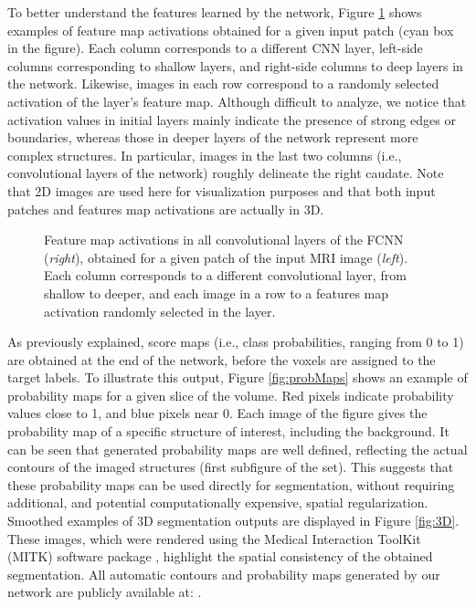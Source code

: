 \documentclass[twoside,fleqn,espcrc2]{elsarticle}
\begin{document}
To better understand the features learned by the network, Figure \ref{fig:featMaps} shows examples of feature map activations obtained for a given input patch (cyan box in the figure). Each column corresponds to a different CNN layer, left-side columns corresponding to shallow layers, and right-side columns to deep layers in the network. Likewise, images in each row correspond to a randomly selected activation of the layer's feature map. Although difficult to analyze, we notice that activation values in initial layers mainly indicate the presence of strong edges or boundaries, whereas those in deeper layers of the network represent more complex structures. In particular, images in the last two columns (i.e., convolutional layers of the network) roughly delineate the right caudate. Note that 2D images are used here for visualization purposes and that both input patches and features map activations are actually in 3D.

\begin{figure}[ht!]
     \begin{center}
        \hspace{-0.25em}
         \end{center}
    \caption{Feature map activations in all convolutional layers of the FCNN (\emph{right}), obtained for a given patch of the input MRI image (\emph{left}). Each column corresponds to a different convolutional layer, from shallow to deeper, and each image in a row to a features map activation randomly selected in the layer.}%
   \label{fig:featMaps}
\end{figure}

As previously explained, score maps (i.e., class probabilities, ranging from 0 to 1) are obtained at the end of the network, before the voxels are assigned to the target labels. To illustrate this output, Figure \ref{fig:probMaps} shows an example of probability maps for a given slice of the volume. Red pixels indicate probability values close to 1, and blue pixels near 0. Each image of the figure gives the probability map of a specific structure of interest, including the background. It can be seen that generated probability maps are well defined, reflecting the actual contours of the imaged structures (first subfigure of the set). This suggests that these probability maps can be used directly for segmentation, without requiring additional, and potential computationally expensive, spatial regularization. Smoothed examples of 3D segmentation outputs are displayed in Figure \ref{fig:3D}. These images, which were rendered using the Medical Interaction ToolKit (MITK) software package \cite{wolf2005medical}, highlight the spatial consistency of the obtained segmentation. All automatic contours and probability maps generated by our network are publicly available at: \sloppy{}.
\end{document}
